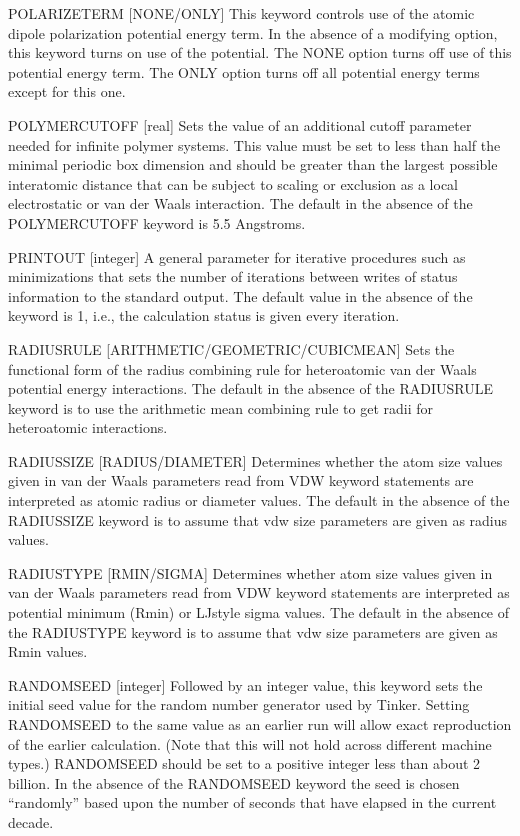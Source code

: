 \documentclass[letterpaper,11pt,english]{sphinxmanual}
\begin{document}
POLARIZETERM {[}NONE/ONLY{]}     This keyword controls use of the atomic dipole polarization potential energy term. In the absence of a modifying option, this keyword turns on use of the potential. The NONE option turns off use of this potential energy term. The ONLY option turns off all potential energy terms except for this one.

POLYMER\sphinxhyphen{}CUTOFF {[}real{]}     Sets the value of an additional cutoff parameter needed for infinite polymer systems. This value must be set to less than half the minimal periodic box dimension and should be greater than the largest possible interatomic distance that can be subject to scaling or exclusion as a local electrostatic or van der Waals interaction. The default in the absence of the POLYMER\sphinxhyphen{}CUTOFF keyword is 5.5 Angstroms.

PRINTOUT {[}integer{]}     A general parameter for iterative procedures such as minimizations that sets the number of iterations between writes of status information to the standard output. The default value in the absence of the keyword is 1, i.e., the calculation status is given every iteration.

RADIUSRULE {[}ARITHMETIC/GEOMETRIC/CUBIC\sphinxhyphen{}MEAN{]}     Sets the functional form of the radius combining rule for heteroatomic van der Waals potential energy interactions. The default in the absence of the RADIUSRULE keyword is to use the arithmetic mean combining rule to get radii for heteroatomic interactions.

RADIUSSIZE {[}RADIUS/DIAMETER{]}     Determines whether the atom size values given in van der Waals parameters read from VDW keyword statements are interpreted as atomic radius or diameter values. The default in the absence of the RADIUSSIZE keyword is to assume that vdw size parameters are given as radius values.

RADIUSTYPE {[}R\sphinxhyphen{}MIN/SIGMA{]}     Determines whether atom size values given in van der Waals parameters read from VDW keyword statements are interpreted as potential minimum (Rmin) or LJ\sphinxhyphen{}style sigma values. The default in the absence of the RADIUSTYPE keyword is to assume that vdw size parameters are given as Rmin values.

RANDOMSEED {[}integer{]}     Followed by an integer value, this keyword sets the initial seed value for the random number generator used by Tinker. Setting RANDOMSEED to the same value as an earlier run will allow exact reproduction of the earlier calculation. (Note that this will not hold across different machine types.) RANDOMSEED should be set to a positive integer less than about 2 billion. In the absence of the RANDOMSEED keyword the seed is chosen “randomly” based upon the number of seconds that have elapsed in the current decade.
\end{document}
